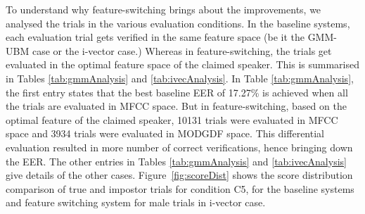 \documentclass[preprint,12pt,5p]{elsarticle}
\begin{document}
To understand why feature-switching brings about the improvements, we
analysed the trials in the various evaluation conditions. In the baseline
systems, each evaluation trial gets verified in the same feature space (be it
the GMM-UBM case or the i-vector case.) Whereas in feature-switching, the trials
get evaluated in the optimal feature space of the claimed speaker. This is
summarised in Tables \ref{tab:gmmAnalysis} and \ref{tab:ivecAnalysis}.  In Table
\ref{tab:gmmAnalysis}, the first entry states that the best baseline EER of
17.27\% is achieved when all the trials are evaluated in MFCC space. But in
feature-switching, based on the optimal feature of the claimed speaker, 10131
trials were evaluated in MFCC space and 3934 trials were evaluated in MODGDF
space. This differential evaluation resulted in more number of correct
verifications, hence bringing down the EER. The other entries in Tables
\ref{tab:gmmAnalysis} and \ref{tab:ivecAnalysis} give details of the other
cases. Figure~\ref{fig:scoreDist} shows the score distribution comparison of true and 
impostor trials for condition C5, for the baseline systems and feature switching system 
for male trials in i-vector case.

\begin{table}[t!hb]
\centering
\caption{Distribution of the speakers to MFCC and MODGDF optimal feature spaces.}
\label{tab:optFeat}
\end{table}
\end{document}

